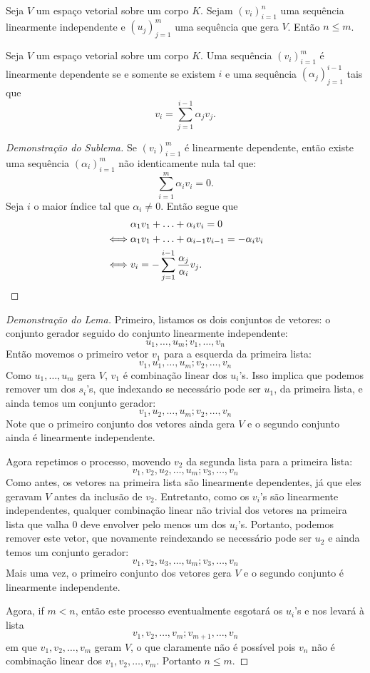 \documentclass[11pt,twoside,a4paper]{book}
\begin{document}
\begin{lema}\label{basefin1} Seja $V$ um espaço vetorial sobre um corpo $K$.
Sejam $(v_i)_{i=1}^n$ uma sequência linearmente independente e
$(u_j)_{j=1}^m$ uma sequência que gera $V$. Então $n\leq m$.
\end{lema}

\begin{sublema} Seja $V$ um espaço vetorial sobre um corpo $K$.
Uma sequência $(v_i)_{i=1}^m$ é linearmente dependente se e somente se existem $i$ e uma sequência $(\alpha_j)_{j=1}^{i-1}$ tais que \[v_i=\sum\limits_{j=1}^{i-1}\alpha_jv_j.\]
\end{sublema}
\begin{proof}[Demonstração do Sublema]
Se $(v_i)_{i=1}^m$ é linearmente dependente, então existe uma sequência $(\alpha_i)_{i=1}^m$ não identicamente nula tal que:
\[
\sum_{i=1}^m\alpha_iv_i=0.
\]
Seja $i$ o maior índice tal que $\alpha_i\neq 0$.
Então segue que
\begin{align*}
&\alpha_1 v_1 + \ldots + \alpha_i v_i = 0 \\ \iff & \alpha_1v_1 + \ldots + \alpha_{i-1} v_{i-1} = - \alpha_i v_i \\ \iff &
v_i= - \sum\limits_{j=1}^{i-1}\frac{\alpha_j}{\alpha_i}v_j.\qedhere
\end{align*}
\end{proof}

\begin{proof}[Demonstração do Lema]
Primeiro, listamos os dois conjuntos de vetores: o conjunto gerador seguido do conjunto linearmente independente:
\[
u_1,\dots,u_m;v_1,\dots,v_n
\]
Então movemos o primeiro vetor $v_1$ para a esquerda da primeira lista:
\[
v_1,u_1,\dots,u_m;v_2,\dots,v_n
\]
Como $u_1,\dots,u_m$ gera $V$, $v_1$ é combinação linear dos $u_i$'s. Isso implica que
podemos remover um dos $s_i$'s, que indexando se necessário pode ser $u_1$,
da primeira lista, e ainda temos um conjunto gerador:
\[
v_1,u_2,\dots,u_m;v_2,\dots,v_n
\]
Note que o primeiro conjunto dos vetores ainda gera $V$ e o segundo conjunto ainda é linearmente
independente.

\medskip
\noindent
Agora repetimos o processo, movendo $v_2$ da segunda lista para a primeira lista:
\[
v_1,v_2,u_2,\dots,u_m;v_3,\dots,v_n
\]
Como antes, os vetores na primeira lista são linearmente dependentes, já que eles geravam
$V$ antes da inclusão de $v_2$. Entretanto, como os $v_i$'s são linearmente independentes,
qualquer combinação linear não trivial dos vetores na primeira lista que valha $0$
deve envolver pelo menos um dos $u_i$'s. Portanto, podemos remover este vetor, que
novamente reindexando se necessário pode ser $u_2$ e ainda temos um conjunto gerador:
\[
v_1,v_2,u_3,\dots,u_m;v_3,\dots,v_n
\]
Mais uma vez, o primeiro conjunto dos vetores gera $V$ e o segundo conjunto é linearmente
independente.

\medskip
\noindent
Agora, if $m<n$, então este processo eventualmente esgotará os $u_i$'s e nos levará à lista
\[
v_1,v_2,\dots,v_m;v_{m+1},\dots,v_n
\]
em que $v_1,v_2,\dots,v_m$ geram $V$, o que claramente não é possível pois $v_n$ não é combinação linear
dos $v_1,v_2,\dots,v_m$. Portanto $n\leq m$.
\end{proof}
\end{document}
